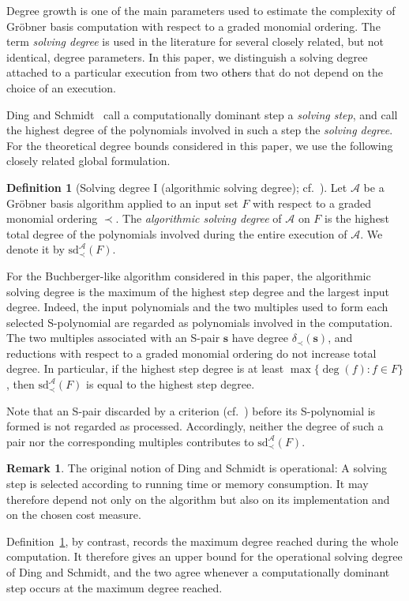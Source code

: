 \documentclass{article}
\theoremstyle{definition}
\newtheorem{definition}[theorem]{Definition}
\newtheorem{remark}[theorem]{Remark}
\theoremstyle{plain}
\theoremstyle{plain}
\theoremstyle{plain}
\theoremstyle{plain}
\numberwithin{equation}{subsection}
\begin{document}
Degree growth is one of the main parameters used to estimate the complexity of Gr\"obner basis computation with respect to a graded monomial ordering.
The term \emph{solving degree} is used in the literature for several closely related, but not identical, degree parameters.
In this paper, we distinguish a solving degree attached to a particular execution from two \textcolor{black}{others} that do not depend on the choice of an execution.

Ding and Schmidt~\cite{Ding2013} call a computationally dominant step a \emph{solving step}, and call the highest degree of the polynomials involved in such a step the \emph{solving degree}.
For the theoretical degree bounds considered in this paper, we use the following closely related global formulation.

\begin{definition}[Solving degree I (algorithmic solving degree);
cf.\ {\cite[p.~36]{Ding2013}}]\label{def:solvedeg1}
Let $\mathcal A$ be a Gr\"obner basis algorithm applied to an input set $F$ with respect to a graded monomial ordering $\prec$.
The \emph{algorithmic solving degree} of $\mathcal A$ on $F$ is the highest total degree of the polynomials involved during the entire execution of $\mathcal A$.
We denote it by $\mathrm{sd}_{\prec}^{\mathcal A}(F)$.
\end{definition}

For the Buchberger-like algorithm considered in this paper, the algorithmic solving degree is the maximum of the highest step degree and the largest input degree.
Indeed, the input polynomials and the two multiples used to form each selected S-polynomial are regarded as polynomials involved in the computation.
The two multiples associated with an S-pair $\bm s$ have degree $\delta_\prec(\bm s)$, and reductions with respect to a graded monomial ordering do not increase total degree.
In particular, if the highest step degree is at least $\max\{\deg(f):f\in F\}$, then $\mathrm{sd}_{\prec}^{\mathcal A}(F)$ is equal to the highest step degree.

Note that an S-pair discarded by a criterion (cf.\ \cite[p.\ 116]{CLO}) before its S-polynomial is formed is not regarded as processed.
Accordingly, neither the degree of such a pair nor the corresponding multiples contributes to $\mathrm{sd}_{\prec}^{\mathcal A}(F)$.

\begin{remark}
The original notion of Ding and Schmidt is operational:
A solving step is selected according to running time or memory consumption.
It may therefore depend not only on the algorithm but also on its implementation and on the chosen cost measure.

Definition~\ref{def:solvedeg1}, by contrast, records the maximum degree reached during the whole computation.
It therefore gives an upper bound for the operational solving degree of Ding and Schmidt, and the two agree whenever a computationally dominant step occurs at the maximum degree reached.
\end{remark}
\end{document}
